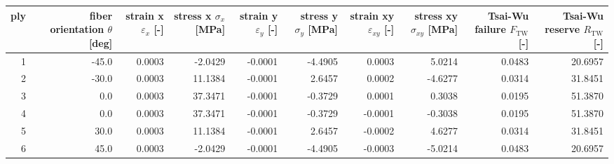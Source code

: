 \begin{tabular}{rrrrrrrrrr}
\toprule
ply & fiber orientation $\theta$ [deg] & strain x $\varepsilon_x$ [-] & stress x $\sigma_x$ [MPa] & strain y $\varepsilon_y$ [-] & stress y $\sigma_y$ [MPa] & strain xy $\varepsilon_{xy}$ [-] & stress xy $\sigma_{xy}$ [MPa] & Tsai-Wu failure $F_\mathrm{TW}$ [-] & Tsai-Wu reserve $R_\mathrm{TW}$ [-] \\
\midrule
  1 &                            -45.0 &                       0.0003 &                   -2.0429 &                      -0.0001 &                   -4.4905 &                           0.0003 &                        5.0214 &                              0.0483 &                             20.6957 \\
  2 &                            -30.0 &                       0.0003 &                   11.1384 &                      -0.0001 &                    2.6457 &                           0.0002 &                       -4.6277 &                              0.0314 &                             31.8451 \\
  3 &                              0.0 &                       0.0003 &                   37.3471 &                      -0.0001 &                   -0.3729 &                           0.0001 &                        0.3038 &                              0.0195 &                             51.3870 \\
  4 &                              0.0 &                       0.0003 &                   37.3471 &                      -0.0001 &                   -0.3729 &                          -0.0001 &                       -0.3038 &                              0.0195 &                             51.3870 \\
  5 &                             30.0 &                       0.0003 &                   11.1384 &                      -0.0001 &                    2.6457 &                          -0.0002 &                        4.6277 &                              0.0314 &                             31.8451 \\
  6 &                             45.0 &                       0.0003 &                   -2.0429 &                      -0.0001 &                   -4.4905 &                          -0.0003 &                       -5.0214 &                              0.0483 &                             20.6957 \\
\bottomrule
\end{tabular}
